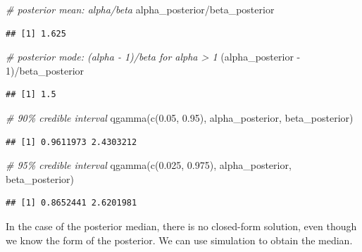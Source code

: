 \documentclass[
]{book}
\newenvironment{Shaded}{\begin{snugshade}}{\end{snugshade}}
\newcommand{\CommentTok}[1]{\textcolor[rgb]{0.56,0.35,0.01}{\textit{#1}}}
\newcommand{\DecValTok}[1]{\textcolor[rgb]{0.00,0.00,0.81}{#1}}
\newcommand{\FloatTok}[1]{\textcolor[rgb]{0.00,0.00,0.81}{#1}}
\newcommand{\FunctionTok}[1]{\textcolor[rgb]{0.00,0.00,0.00}{#1}}
\newcommand{\NormalTok}[1]{#1}
\newcommand{\SpecialCharTok}[1]{\textcolor[rgb]{0.00,0.00,0.00}{#1}}
\begin{document}
\begin{Shaded}
\begin{Highlighting}[]
\CommentTok{\# posterior mean: alpha/beta}
\NormalTok{alpha\_posterior}\SpecialCharTok{/}\NormalTok{beta\_posterior}
\end{Highlighting}
\end{Shaded}

\begin{verbatim}
## [1] 1.625
\end{verbatim}

\begin{Shaded}
\begin{Highlighting}[]
\CommentTok{\# posterior mode: (alpha {-} 1)/beta for alpha \textgreater{} 1}
\NormalTok{(alpha\_posterior }\SpecialCharTok{{-}} \DecValTok{1}\NormalTok{)}\SpecialCharTok{/}\NormalTok{beta\_posterior}
\end{Highlighting}
\end{Shaded}

\begin{verbatim}
## [1] 1.5
\end{verbatim}

\begin{Shaded}
\begin{Highlighting}[]
\CommentTok{\# 90\% credible interval}
\FunctionTok{qgamma}\NormalTok{(}\FunctionTok{c}\NormalTok{(}\FloatTok{0.05}\NormalTok{, }\FloatTok{0.95}\NormalTok{), alpha\_posterior, beta\_posterior)}
\end{Highlighting}
\end{Shaded}

\begin{verbatim}
## [1] 0.9611973 2.4303212
\end{verbatim}

\begin{Shaded}
\begin{Highlighting}[]
\CommentTok{\# 95\% credible interval}
\FunctionTok{qgamma}\NormalTok{(}\FunctionTok{c}\NormalTok{(}\FloatTok{0.025}\NormalTok{, }\FloatTok{0.975}\NormalTok{), alpha\_posterior, beta\_posterior)}
\end{Highlighting}
\end{Shaded}

\begin{verbatim}
## [1] 0.8652441 2.6201981
\end{verbatim}

In the case of the posterior median, there is no closed-form solution, even though we know the form of the posterior. We can use simulation to obtain the median.
\end{document}
